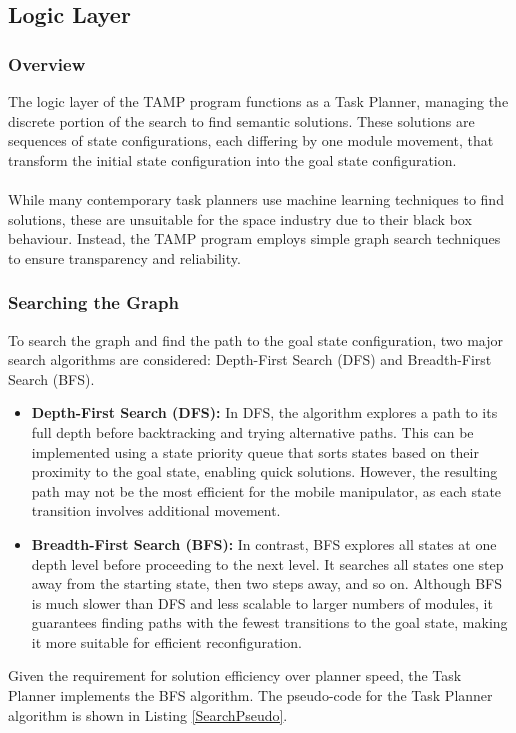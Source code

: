 \subsection{Logic Layer}
\subsubsection{Overview}
The logic layer of the TAMP program functions as a Task Planner, managing the discrete portion of the search to find semantic solutions. These solutions are sequences of state configurations, each differing by one module movement, that transform the initial state configuration into the goal state configuration.
\\\\
While many contemporary task planners use machine learning techniques to find solutions, these are unsuitable for the space industry due to their black box behaviour. Instead, the TAMP program employs simple graph search techniques to ensure transparency and reliability.

\subsubsection{Searching the Graph}
To search the graph and find the path to the goal state configuration, two major search algorithms are considered: Depth-First Search (DFS) and Breadth-First Search (BFS).
\begin{itemize}[]
	\item\textbf{Depth-First Search (DFS):} In DFS, the algorithm explores a path to its full depth before backtracking and trying alternative paths. This can be implemented using a state priority queue that sorts states based on their proximity to the goal state, enabling quick solutions. However, the resulting path may not be the most efficient for the mobile manipulator, as each state transition involves additional movement.
	\item\textbf{Breadth-First Search (BFS):} In contrast, BFS explores all states at one depth level before proceeding to the next level. It searches all states one step away from the starting state, then two steps away, and so on. Although BFS is much slower than DFS and less scalable to larger numbers of modules, it guarantees finding paths with the fewest transitions to the goal state, making it more suitable for efficient reconfiguration.
\end{itemize}
Given the requirement for solution efficiency over planner speed, the Task Planner implements the BFS algorithm. The pseudo-code for the Task Planner algorithm is shown in Listing \ref{SearchPseudo}.

